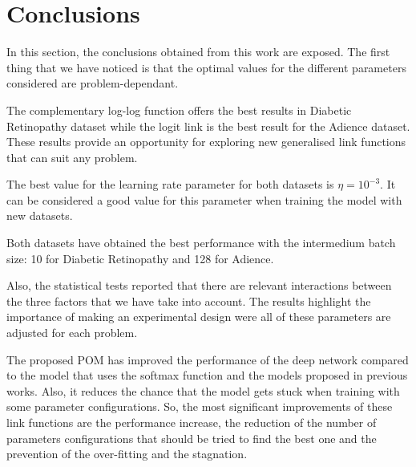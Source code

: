 \documentclass[journal]{IEEEtran}
\begin{document}
	\section{Conclusions}
	\label{sect:conclusions}
	In this section, the conclusions obtained from this work are exposed. The first thing that we have noticed is that the optimal values for the different parameters considered are problem-dependant. 
	
	The complementary log-log function offers the best results in Diabetic Retinopathy dataset while the logit link is the best result for the Adience dataset. These results provide an opportunity for exploring new generalised link functions that can suit any problem.
	
	The best value for the learning rate parameter for both datasets is $\eta = 10^{-3}$. It can be considered a good value for this parameter when training the model with new datasets.
	
	Both datasets have obtained the best performance with the intermedium batch size: 10 for Diabetic Retinopathy and 128 for Adience.
	
	Also, the statistical tests reported that there are relevant interactions between the three factors that we have take into account. The results highlight the importance of making an experimental design were all of these parameters are adjusted for each problem.
	
	The proposed POM has improved the performance of the deep network compared to the model that uses the softmax function and the models proposed in previous works. Also, it reduces the chance that the model gets stuck when training with some parameter configurations. So, the most significant improvements of these link functions are the performance increase, the reduction of the number of parameters configurations that should be tried to find the best one and the prevention of the over-fitting and the stagnation.

	
	
	
\end{document}
